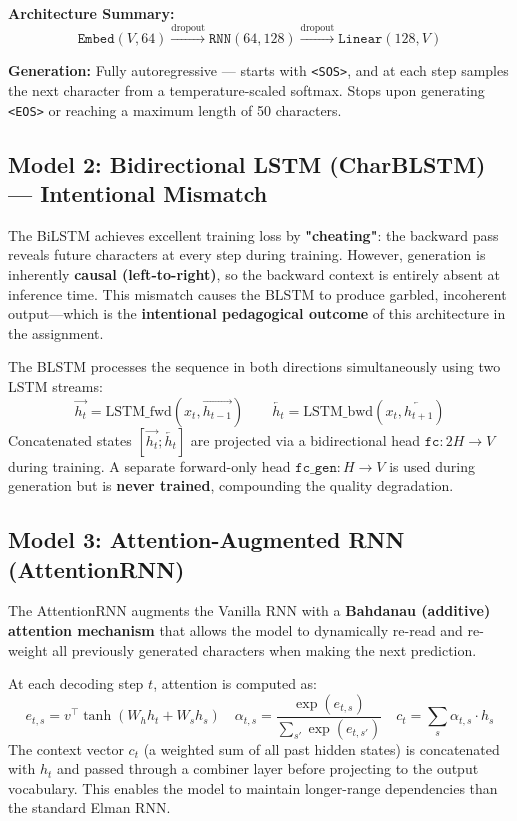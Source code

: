 \documentclass[11pt,a4paper]{article}
\begin{document}
\textbf{Architecture Summary:}
\[
\texttt{Embed}(V, 64) \xrightarrow{\text{dropout}} \texttt{RNN}(64, 128) \xrightarrow{\text{dropout}} \texttt{Linear}(128, V)
\]

\textbf{Generation:} Fully autoregressive — starts with \texttt{<SOS>}, and at each step samples the next character from a temperature-scaled softmax. Stops upon generating \texttt{<EOS>} or reaching a maximum length of 50 characters.

\subsection{Model 2: Bidirectional LSTM (CharBLSTM) — Intentional Mismatch}

\begin{warningBox}
The BiLSTM achieves excellent training loss by \textbf{"cheating"}: the backward pass reveals future characters at every step during training. However, generation is inherently \textbf{causal (left-to-right)}, so the backward context is entirely absent at inference time. This mismatch causes the BLSTM to produce garbled, incoherent output—which is the \textbf{intentional pedagogical outcome} of this architecture in the assignment.
\end{warningBox}

The BLSTM processes the sequence in both directions simultaneously using two LSTM streams:
\[ \overrightarrow{h_t} = \text{LSTM\_fwd}(x_t, \overrightarrow{h_{t-1}}) \qquad \overleftarrow{h_t} = \text{LSTM\_bwd}(x_t, \overleftarrow{h_{t+1}}) \]
Concatenated states $[\overrightarrow{h_t}; \overleftarrow{h_t}]$ are projected via a bidirectional head $\texttt{fc}: 2H \to V$ during training. A separate forward-only head $\texttt{fc\_gen}: H \to V$ is used during generation but is \textbf{never trained}, compounding the quality degradation.

\subsection{Model 3: Attention-Augmented RNN (AttentionRNN)}

The AttentionRNN augments the Vanilla RNN with a \textbf{Bahdanau (additive) attention mechanism} that allows the model to dynamically re-read and re-weight all previously generated characters when making the next prediction.

At each decoding step $t$, attention is computed as:
\[
e_{t,s} = v^\top \tanh(W_h h_t + W_s h_s) \quad \alpha_{t,s} = \frac{\exp(e_{t,s})}{\sum_{s'} \exp(e_{t,s'})} \quad c_t = \sum_s \alpha_{t,s} \cdot h_s
\]
The context vector $c_t$ (a weighted sum of all past hidden states) is concatenated with $h_t$ and passed through a combiner layer before projecting to the output vocabulary. This enables the model to maintain longer-range dependencies than the standard Elman RNN.
\end{document}
